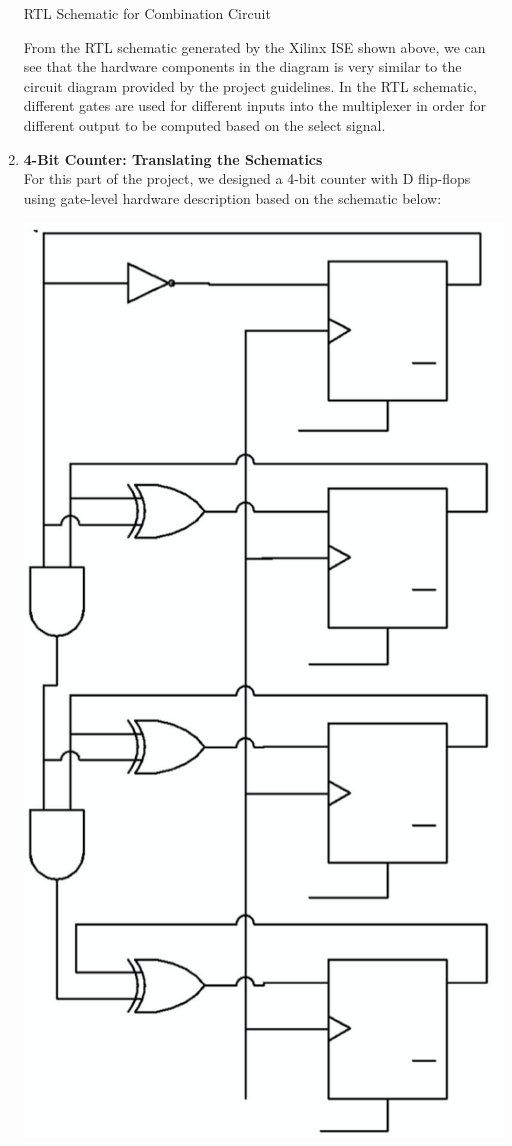 \documentclass{article}
\begin{document}
\begin{enumerate}
\begin{center}
        \caption{RTL Schematic for Combination Circuit}
    \end{center}
    From the RTL schematic generated by the Xilinx ISE shown above, we can see that the hardware components in the diagram is very similar to the circuit diagram provided by the project guidelines. In the RTL schematic, different gates are used for different inputs into the multiplexer in order for different output to be computed based on the select signal.
    \item \textbf{4-Bit Counter: Translating the Schematics} \\
    For this part of the project, we designed a 4-bit counter with D flip-flops using gate-level hardware description based on the schematic below:
    \begin{center}
        \includegraphics[scale=0.27]{SeqCircuit.png} \\

\end{center}
\end{enumerate}
\end{document}

